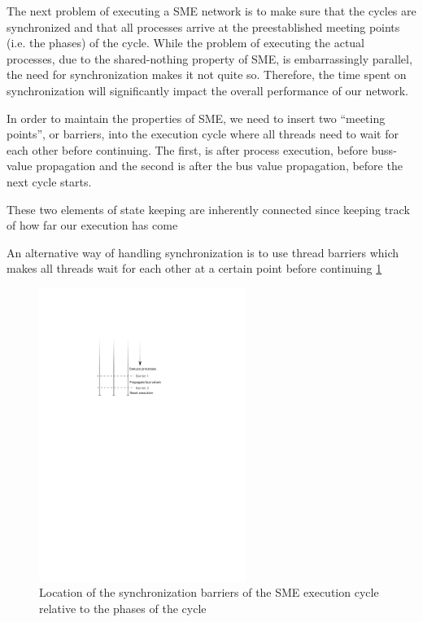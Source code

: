 The next problem of executing a SME network is to make sure that the
cycles are synchronized and that all processes arrive at the
preestablished meeting points (i.e. the phases) of the cycle. While
the problem of executing the actual processes, due to the
shared-nothing property of SME, is embarrassingly parallel, the need
for synchronization makes it not quite so. Therefore, the time spent
on synchronization will significantly impact the overall performance
of our network.

In order to maintain the properties of SME, we need to insert two
"`meeting points"', or barriers, into the execution cycle where all
threads need to wait for each other before continuing. The first, is
after process execution, before buss-value propagation and the second
is after the bus value propagation, before the next cycle starts.

These two elements of state keeping are inherently connected since
keeping track of how far our execution has come 

An alternative way of handling synchronization is to use thread
barriers which makes all threads wait for each other at a certain
point before continuing \cref{fig:barriers}


\begin{figure}
\centering
\includegraphics[width=0.6\textwidth]{figures/barriers}
\caption[Location of synchronization barriers]{Location of the
  synchronization barriers of the SME execution cycle relative to the
  phases of the cycle}
\label{fig:barriers}
\end{figure}

